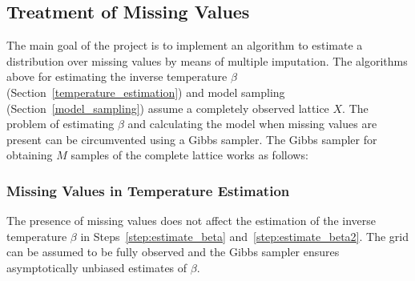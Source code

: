 \documentclass[12pt, twoside]{article}
\newcommand{\1}{\mathbb{1}}
\begin{document}
\subsection{Treatment of Missing Values}
The main goal of the project is to implement an algorithm to estimate a distribution over missing values by means of multiple imputation. The algorithms above for estimating the inverse temperature $\beta$ (Section~\ref{temperature_estimation}) 
and model sampling (Section~\ref{model_sampling}) assume a completely observed lattice $X$. The problem of estimating $\beta$ and calculating the model when missing values are present can be circumvented using a Gibbs sampler.
The Gibbs sampler for obtaining $M$ samples of the complete lattice works as follows: \\


\subsubsection{Missing Values in Temperature  Estimation}
The presence of missing values does not affect the estimation of the inverse temperature $\beta$ in Steps~\ref{step:estimate_beta} and~\ref{step:estimate_beta2}. The grid can be assumed to be fully observed and the Gibbs sampler ensures asymptotically unbiased estimates of $\beta$.
\end{document}

